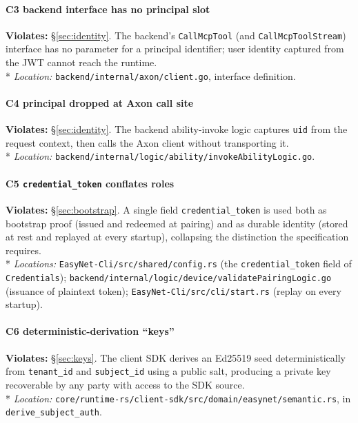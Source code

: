 \documentclass[11pt,a4paper]{article}
\begin{document}
\paragraph{C3 \textemdash{} backend interface has no principal slot}
\textbf{Violates:} \S\ref{sec:identity}.
The backend's \texttt{CallMcpTool} (and
\texttt{CallMcpToolStream}) interface has no parameter for a
principal identifier; user identity captured from the JWT cannot
reach the runtime.
\\*
\emph{Location:} \texttt{backend/internal/axon/client.go},
interface definition.

\paragraph{C4 \textemdash{} principal dropped at Axon call site}
\textbf{Violates:} \S\ref{sec:identity}.
The backend ability-invoke logic captures \texttt{uid} from the
request context, then calls the Axon client without transporting it.
\\*
\emph{Location:}
\texttt{backend/internal/logic/ability/invokeAbilityLogic.go}.

\paragraph{C5 \textemdash{} \texttt{credential\_token} conflates roles}
\textbf{Violates:} \S\ref{sec:bootstrap}.
A single field \texttt{credential\_token} is used both as bootstrap
proof (issued and redeemed at pairing) and as durable identity
(stored at rest and replayed at every startup), collapsing the
distinction the specification requires.
\\*
\emph{Locations:} \texttt{EasyNet-Cli/src/shared/config.rs}
(the \texttt{credential\_token} field of \texttt{Credentials});
\texttt{backend/internal/logic/device/validatePairingLogic.go}
(issuance of plaintext token);
\texttt{EasyNet-Cli/src/cli/start.rs} (replay on every startup).

\paragraph{C6 \textemdash{} deterministic-derivation ``keys''}
\textbf{Violates:} \S\ref{sec:keys}.
The client SDK derives an Ed25519 seed deterministically from
\texttt{tenant\_id} and \texttt{subject\_id} using a public salt,
producing a private key recoverable by any party with access to the
SDK source.
\\*
\emph{Location:}
\texttt{core/runtime-rs/client-sdk/src/domain/easynet/semantic.rs},
in \texttt{derive\_subject\_auth}.
\end{document}

